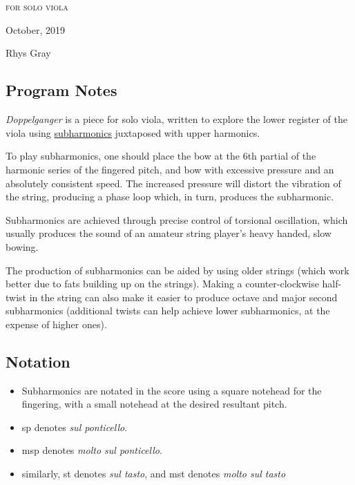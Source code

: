 
\chapter[\violaPiece]{}

\vspace*{3cm}
\begin{center}
\textsc{for solo viola}

\vspace*{3.5cm}

\HRule{0.5pt}


\LARGE \textbf{\uppercase{\violaPiece}}
\HRule{2pt}

\vspace{1.3cm}

\normalsize October, 2019
\date{}

\vspace*{5\baselineskip}

Rhys Gray

\end{center}
\newpage
\newpage

\section*{Program Notes}
\emph{Doppelganger} is a piece for solo viola, written to explore the lower register of the viola using \hyperref[sec:subharmonics]{subharmonics} juxtaposed with upper harmonics. 

To play subharmonics, one should place the bow at the 6th partial of the harmonic series of the fingered pitch, and bow with excessive pressure and an absolutely consistent speed. 
The increased pressure will distort the vibration of the string, producing a phase loop which, in turn, produces the subharmonic. 

Subharmonics are achieved through precise control of torsional oscillation, which usually produces the sound of an amateur string player's heavy handed, slow bowing. 

The production of subharmonics can be aided by using older strings (which work better due to fats building up on the strings). 
Making a counter-clockwise half-twist in the string can also make it easier to produce octave and major second subharmonics (additional twists can help achieve lower subharmonics, at the expense of higher ones).

\section*{Notation}
\begin{itemize}

    \item Subharmonics are notated in the score using a square notehead for the fingering, with a small notehead at the desired resultant pitch.
    \item sp denotes \emph{sul ponticello}.
    \item msp denotes \emph{molto sul ponticello}.
    \item similarly, st denotes \emph{sul tasto}, and mst denotes \emph{molto sul tasto}
\end{itemize}

\newpage\label{app:doppelganger Score}

% 
